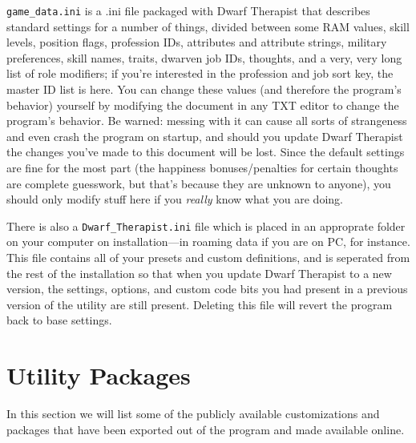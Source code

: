 \documentclass[]{article}
\begin{document}
\texttt{game\_data.ini} is a .ini file packaged with Dwarf Therapist that describes standard settings for
a number of things, divided between some RAM values, skill levels, position flags, profession IDs,
attributes and attribute strings, military preferences, skill names, traits, dwarven job IDs, thoughts,
and a very, very long list of role modifiers; if you're interested in the profession and job
sort key, the master ID list is here. You can change these values (and therefore the program's behavior)
yourself by modifying the document in any TXT editor to change the program's behavior. Be warned:
messing with it can cause all sorts of strangeness and even crash the program on startup, and should you
update Dwarf Therapist the changes you've made to this document will be lost. Since the default settings
are fine for the most part (the happiness bonuses/penalties for certain thoughts are complete guesswork,
but that's because they are unknown to anyone), you should only modify stuff here if you \emph{really}
know what you are doing.

There is also a \texttt{Dwarf\_Therapist.ini} file which is placed in an approprate folder on your
computer on installation---in roaming data if you are on PC, for instance. This file contains all of
your presets and custom definitions, and is seperated from the rest of the installation so that when you
update Dwarf Therapist to a new version, the settings, options, and custom code bits you had present in
a previous version of the utility are still present. Deleting this file will revert the program back to
base settings.

\newpage

\section{Utility Packages}
\label{sec:Utility Packages}

In this section we will list some of the publicly available customizations and packages that have been
exported out of the program and made available online.
\end{document}
